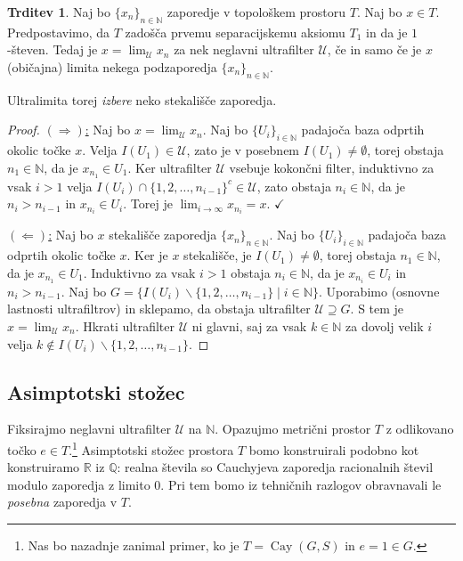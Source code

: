 \documentclass[11pt]{book}
\def\NN{\mathbb{N}}
\def\QQ{\mathbb{Q}}
\def\RR{\mathbb{R}}
\def\UU{\mathcal{U}}
\DeclareMathOperator\Cay{Cay}
\def\kljuka{$\checkmark$}
\theoremstyle{definition}
\theoremstyle{zgled}
\theoremstyle{odprtproblem}
\theoremstyle{domacanaloga}
\newenvironment{dokaz}
    {\color{siva}\begin{proof}}
    {\end{proof}}
\theoremstyle{izrek}
\newtheorem*{trditev}{Trditev}
\begin{document}
\begin{trditev}
Naj bo $\{ x_n \}_{n \in \NN}$ zaporedje v topološkem prostoru $T$. Naj bo $x \in T$. Predpostavimo, da $T$ zadošča prvemu separacijskemu aksiomu $T_1$ in da je $1$-števen. Tedaj je $x = \lim_\UU x_n$ za nek neglavni ultrafilter $\UU$, če in samo če je $x$ (običajna) limita nekega podzaporedja $\{ x_n \}_{n \in \NN}$.
\end{trditev}

Ultralimita torej {\em izbere} neko stekališče zaporedja.

\begin{dokaz}
\underline{$(\Rightarrow)$:} Naj bo $x = \lim_\UU x_n$. Naj bo $\{ U_i \}_{i \in \NN}$ padajoča baza odprtih okolic točke $x$. Velja $I(U_1) \in \UU$, zato je v posebnem $I(U_1) \neq \emptyset$, torej obstaja $n_1 \in \NN$, da je $x_{n_1} \in U_1$. Ker ultrafilter $\UU$ vsebuje kokončni filter, induktivno za vsak $i > 1$ velja $I(U_i) \cap \{ 1,2,\dots,n_{i-1} \}^c \in \UU$, zato obstaja $n_i \in \NN$, da je $n_i > n_{i-1}$ in $x_{n_i} \in U_i$. Torej je $\lim_{i \to \infty} x_{n_i} = x$. \kljuka

\underline{$(\Leftarrow)$:} Naj bo $x$ stekališče zaporedja $\{ x_n \}_{n \in \NN}$. Naj bo $\{ U_i \}_{i \in \NN}$ padajoča baza odprtih okolic točke $x$. Ker je $x$ stekališče, je $I(U_1) \neq \emptyset$, torej obstaja $n_1 \in \NN$, da je $x_{n_1} \in U_1$. Induktivno za vsak $i > 1$ obstaja $n_i \in \NN$, da je $x_{n_i} \in U_i$ in $n_i > n_{i-1}$. Naj bo $G = \{ I(U_i) \backslash \{ 1, 2, \dots, n_{i-1} \} \mid i \in \NN \}$. Uporabimo {\sc (osnovne lastnosti ultrafiltrov)} in sklepamo, da obstaja ultrafilter $\UU \supseteq G$. S tem je $x = \lim_\UU x_n$. Hkrati ultrafilter $\UU$ ni glavni, saj za vsak $k \in \NN$ za dovolj velik $i$ velja $k \notin I(U_i) \backslash \{ 1,2,\dots,n_{i-1} \}$.
\end{dokaz}

\subsection{Asimptotski stožec}

Fiksirajmo neglavni ultrafilter $\UU$ na $\NN$. Opazujmo metrični prostor $T$ z odlikovano točko $e \in T$.\footnote{Nas bo nazadnje zanimal primer, ko je $T = \Cay(G,S)$ in $e = 1 \in G$.} Asimptotski stožec prostora $T$ bomo konstruirali podobno kot konstruiramo $\RR$ iz $\QQ$: realna števila so Cauchyjeva zaporedja racionalnih števil modulo zaporedja z limito $0$. Pri tem bomo iz tehničnih razlogov obravnavali le {\em posebna} zaporedja v $T$.
\end{document}
